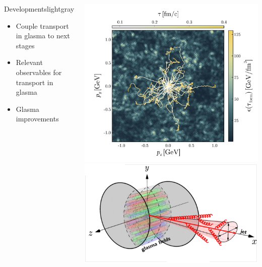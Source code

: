 \documentclass[aspectratio=169,11pt,usenames,dvipsnames]{beamer}
\begin{document}
\begin{frame}
\begin{center}
\begin{columns}
\begin{center}
\begin{custombox2}{{\color{jyured}\large Developments}}{lightgray}
\begin{varwidth}{0.78\textwidth}
\begin{itemize}
                        \item Couple transport in glasma to next stages
                        \item Relevant observables for transport in glasma
                        \item Glasma improvements
                    \end{itemize}
                    \end{varwidth}
                \end{custombox2}
            \end{center}
                \begin{center}\includegraphics[width=0.9\columnwidth]{images/hqs_trajectories.png}\\[5pt]
                    \includegraphics[width=\columnwidth]{images/momentum_broadening_flipped_jetquenched_notext.pdf}\end{center}
        \end{columns}
    \end{center}
\end{frame}
\end{document}
